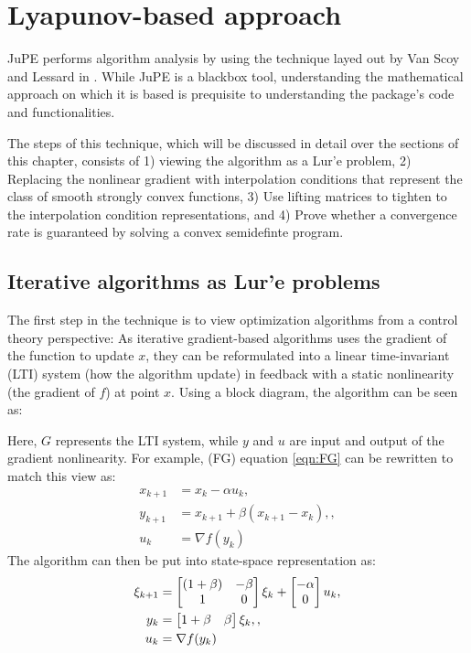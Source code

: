 \chapter{Lyapunov-based approach}

JuPE performs algorithm analysis by using the technique layed out by Van Scoy and Lessard in \cite{tutorial}. While JuPE is a blackbox tool, understanding the mathematical approach on which it is based is prequisite to understanding the package's code and functionalities.

The steps of this technique, which will be discussed in detail over the sections of this chapter, consists of 1) viewing the algorithm as a Lur'e problem, 2) Replacing the nonlinear gradient with interpolation conditions that represent the class of smooth strongly convex functions, 3) Use lifting matrices to tighten to the interpolation condition representations, and 4) Prove whether a convergence rate is guaranteed by solving a convex semidefinte program.
\section{Iterative algorithms as Lur'e problems}

The first step in the technique is to view optimization algorithms from a control theory perspective: As iterative gradient-based algorithms uses the gradient of the function to update \(x\), they can be reformulated into a linear time-invariant (LTI) system (how the algorithm update) in feedback with a static nonlinearity (the gradient of \(f\)) at point \(x\). Using a block diagram, the algorithm can be seen as:

Here, \(G\) represents the LTI system, while \(y\) and \(u\) are input and output of the gradient nonlinearity. For example, (FG) equation \ref{eqn:FG} can be rewritten to match this view as:
\begin{subequations} \label{eqn:FG2}
	\begin{align}
	  x_{k+1}     &=x_k-\alpha u_k \label{eq_FGstate},       \\
	  y_{k+1} &=x_{k+1}+\beta (x_{k+1}-x_k), \label{eq_FGinterpolated point}, \\
	  u_k &= \nabla f(y_k) \label{eq_FGggradient}
	\end{align}
	\end{subequations}
The algorithm can then be put into state-space representation as:
\begin{subequations} \label{eqn:FGss }
	\begin{align}
	  \xi_{k+1} &= \begin{bmatrix}(1+\beta) & -\beta\\ 1 & 0\end{bmatrix}\xi_k  + \begin{bmatrix}-\alpha\\ 0\end{bmatrix}u_k \label{eq_FGssstate}, \\
	  y_k &= \begin{bmatrix}1+\beta & \beta\end{bmatrix}\xi_k, \label{eq_FGssinterpolation},\\
	  u_k &= \nabla f(y_k) \label{eq_FGssgradient}
	\end{align}
	\end{subequations}

